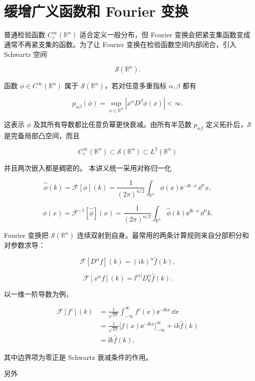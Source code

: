 \section{缓增广义函数和 Fourier 变换}
\label{sec:tempered-fourier}

普通检验函数 $C_c^\infty(\mathbb R^n)$ 适合定义一般分布，但 Fourier 变换会把紧支集函数变成通常不再紧支集的函数。为了让 Fourier 变换在检验函数空间内部闭合，引入 Schwartz 空间

\[
\mathcal S(\mathbb R^n).
\]

函数 $\phi\in C^\infty(\mathbb R^n)$ 属于 $\mathcal S(\mathbb R^n)$，若对任意多重指标 $\alpha,\beta$ 都有

\[
p_{\alpha\beta}(\phi)
=\sup_{x\in\mathbb R^n}|x^\alpha D^\beta\phi(x)|<\infty.
\]

这表示 $\phi$ 及其所有导数都比任意负幂更快衰减。由所有半范数 $p_{\alpha\beta}$ 定义拓扑后，$\mathcal S$ 是完备局部凸空间，而且

\[
C_c^\infty(\mathbb R^n)\subset\mathcal S(\mathbb R^n)\subset L^2(\mathbb R^n)
\]

并且两次嵌入都是稠密的。
本讲义统一采用对称归一化

\begin{equation*}\widehat\phi(k)=\mathcal F[\phi](k)
=\frac1{(2\pi)^{n/2}}
\int_{\mathbb R^n}\phi(x)\ee^{-\ii k\cdot x}\,\dd^n x,\end{equation*}

\[
\phi(x)=\mathcal F^{-1}[\widehat\phi](x)
=\frac1{(2\pi)^{n/2}}
\int_{\mathbb R^n}\widehat\phi(k)\ee^{\ii k\cdot x}\,\dd^n k.
\]

Fourier 变换把 $\mathcal S(\mathbb R^n)$ 连续双射到自身。最常用的两条计算规则来自分部积分和对参数求导：

\[
\mathcal F[D^\alpha f](k)=(ik)^\alpha\widehat f(k),
\]

\[
\mathcal F[x^\alpha f](k)=\ii^{|\alpha|}D_k^\alpha\widehat f(k).
\]

以一维一阶导数为例，

\[
\begin{aligned}
\mathcal F[f'](k)
&=\frac1{\sqrt{2\pi}}\int_{-\infty}^{\infty}f'(x)\ee^{-\ii kx}\,\dd x\\
&=\frac1{\sqrt{2\pi}}\Big[f(x)\ee^{-\ii kx}\Big]_{-\infty}^{\infty}
+ik\widehat f(k)\\
&=\ii k\widehat f(k),
\end{aligned}
\]

其中边界项为零正是 Schwartz 衰减条件的作用。

另外

